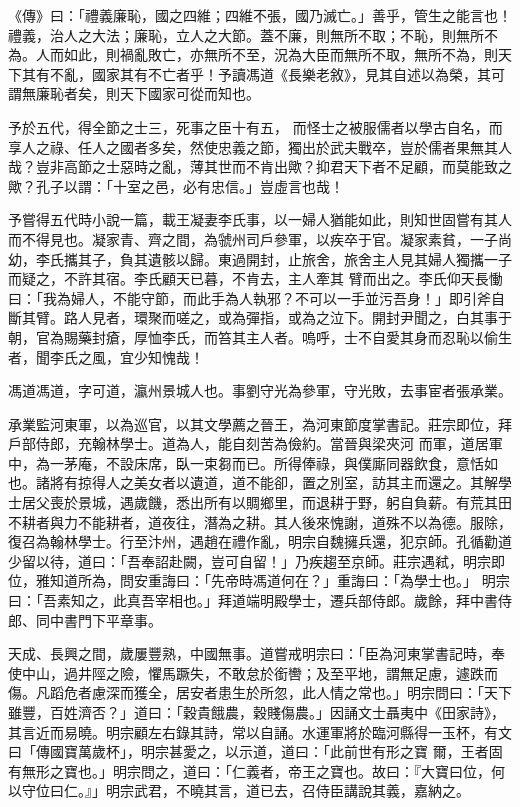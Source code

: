 
\begin{pinyinscope}

 《傳》曰：「禮義廉恥，國之四維；四維不張，國乃滅亡。」善乎，管生之能言也！禮義，治人之大法；廉恥，立人之大節。蓋不廉，則無所不取；不恥，則無所不為。人而如此，則禍亂敗亡，亦無所不至，況為大臣而無所不取，無所不為，則天下其有不亂，國家其有不亡者乎！予讀馮道《長樂老敘》，見其自述以為榮，其可謂無廉恥者矣，則天下國家可從而知也。



 予於五代，得全節之士三，死事之臣十有五，
 而怪士之被服儒者以學古自名，而享人之祿、任人之國者多矣，然使忠義之節，獨出於武夫戰卒，豈於儒者果無其人哉？豈非高節之士惡時之亂，薄其世而不肯出歟？抑君天下者不足顧，而莫能致之歟？孔子以謂：「十室之邑，必有忠信。」豈虛言也哉！



 予嘗得五代時小說一篇，載王凝妻李氏事，以一婦人猶能如此，則知世固嘗有其人而不得見也。凝家青、齊之間，為虢州司戶參軍，以疾卒于官。凝家素貧，一子尚幼，李氏攜其子，負其遺骸以歸。東過開封，止旅舍，旅舍主人見其婦人獨攜一子而疑之，不許其宿。李氏顧天已暮，不肯去，主人牽其
 臂而出之。李氏仰天長慟曰：「我為婦人，不能守節，而此手為人執邪？不可以一手並污吾身！」即引斧自斷其臂。路人見者，環聚而嗟之，或為彈指，或為之泣下。開封尹聞之，白其事于朝，官為賜藥封瘡，厚恤李氏，而笞其主人者。嗚呼，士不自愛其身而忍恥以偷生者，聞李氏之風，宜少知愧哉！



 馮道馮道，字可道，瀛州景城人也。事劉守光為參軍，守光敗，去事宦者張承業。



 承業監河東軍，以為巡官，以其文學薦之晉王，為河東節度掌書記。莊宗即位，拜戶部侍郎，充翰林學士。道為人，能自刻苦為儉約。當晉與梁夾河
 而軍，道居軍中，為一茅庵，不設床席，臥一束芻而已。所得俸祿，與僕廝同器飲食，意恬如也。諸將有掠得人之美女者以遺道，道不能卻，置之別室，訪其主而還之。其解學士居父喪於景城，遇歲饑，悉出所有以賙鄉里，而退耕于野，躬自負薪。有荒其田不耕者與力不能耕者，道夜往，潛為之耕。其人後來愧謝，道殊不以為德。服除，復召為翰林學士。行至汴州，遇趙在禮作亂，明宗自魏擁兵還，犯京師。孔循勸道少留以待，道曰：「吾奉詔赴闕，豈可自留！」乃疾趨至京師。莊宗遇弒，明宗即位，雅知道所為，問安重誨曰：「先帝時馮道何在？」重誨曰：「為學士也。」
 明宗曰：「吾素知之，此真吾宰相也。」拜道端明殿學士，遷兵部侍郎。歲餘，拜中書侍郎、同中書門下平章事。



 天成、長興之間，歲屢豐熟，中國無事。道嘗戒明宗曰：「臣為河東掌書記時，奉使中山，過井陘之險，懼馬蹶失，不敢怠於銜轡；及至平地，謂無足慮，遽跌而傷。凡蹈危者慮深而獲全，居安者患生於所忽，此人情之常也。」明宗問曰：「天下雖豐，百姓濟否？」道曰：「穀貴餓農，穀賤傷農。」因誦文士聶夷中《田家詩》，其言近而易曉。明宗顧左右錄其詩，常以自誦。水運軍將於臨河縣得一玉杯，有文曰「傳國寶萬歲杯」，明宗甚愛之，以示道，道曰：「此前世有形之寶
 爾，王者固有無形之寶也。」明宗問之，道曰：「仁義者，帝王之寶也。故曰：『大寶曰位，何以守位曰仁。』」明宗武君，不曉其言，道已去，召侍臣講說其義，嘉納之。




\end{pinyinscope}
